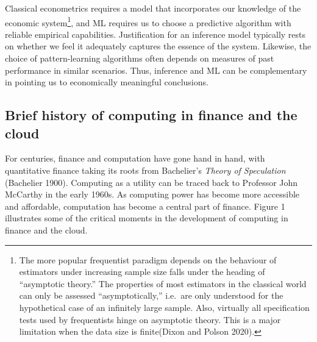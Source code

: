 \documentclass{article}
\begin{document}
Classical econometrics requires a model that incorporates our knowledge
of the economic system\footnote{The more popular frequentist paradigm
  depends on the behaviour of estimators under increasing sample size
  falls under the heading of ``asymptotic theory.'' The properties of
  most estimators in the classical world can only be assessed
  ``asymptotically,'' i.e.~are only understood for the hypothetical case
  of an infinitely large sample. Also, virtually all specification tests
  used by frequentists hinge on asymptotic theory. This is a major
  limitation when the data size is finite(Dixon and Polson 2020).}, and
ML requires us to choose a predictive algorithm with reliable empirical
capabilities. Justification for an inference model typically rests on
whether we feel it adequately captures the essence of the system.
Likewise, the choice of pattern-learning algorithms often depends on
measures of past performance in similar scenarios. Thus, inference and
ML can be complementary in pointing us to economically meaningful
conclusions.

\hypertarget{brief-history-of-computing-in-finance-and-the-cloud}{%
\subsection{Brief history of computing in finance and the
cloud}\label{brief-history-of-computing-in-finance-and-the-cloud}}

For centuries, finance and computation have gone hand in hand, with
quantitative finance taking its roots from Bachelier's \emph{Theory of
Speculation} (Bachelier 1900). Computing as a utility can be traced back
to Professor John McCarthy in the early 1960s. As computing power has
become more accessible and affordable, computation has become a central
part of finance. Figure 1 illustrates some of the critical moments in
the development of computing in finance and the cloud.
\end{document}
